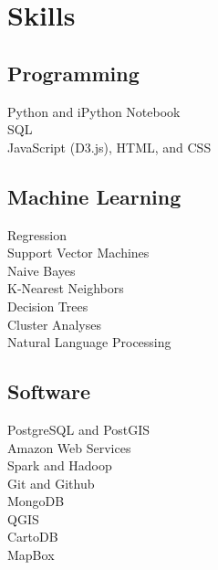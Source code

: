 \documentclass[letterpaper]{deedy-resume} %
\begin{document}
\begin{minipage}[t]{0.33\textwidth} %


\section{Skills}

\subsection{Programming}
Python and iPython Notebook \\
SQL \\
JavaScript (D3.js), HTML, and CSS \\

\sectionspace %

\subsection{Machine Learning}
Regression \\
Support Vector Machines \\
Naive Bayes \\
K-Nearest Neighbors \\
Decision Trees \\
Cluster Analyses \\
Natural Language Processing \\

\sectionspace %

\subsection{Software}
PostgreSQL and PostGIS \\
Amazon Web Services \\
Spark and Hadoop \\
Git and Github \\
MongoDB \\
QGIS \\
CartoDB \\
MapBox \\


\sectionspace %



\end{minipage}
\end{document}

